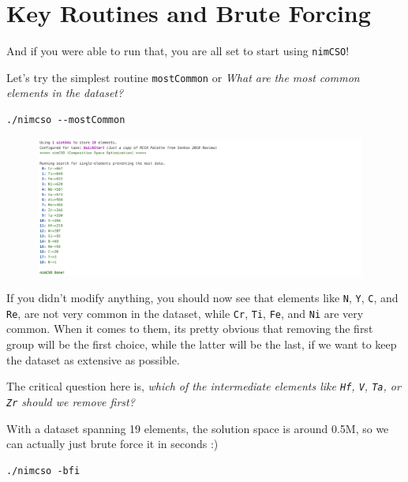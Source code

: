 \hypertarget{key-routines-and-brute-forcing}{
\section{Key Routines and Brute Forcing}\label{nimcsotutorial:key-routines-and-brute-forcing}}

And if you were able to run that, you are all set to start using
\texttt{nimCSO}!

Let's try the simplest routine \texttt{mostCommon} or
\emph{What are the most common elements in the dataset?}

\begin{verbatim}
./nimcso --mostCommon
\end{verbatim}

\begin{figure}[H]
  \centering
  \includegraphics[width=0.97\textwidth]{nimcsotutorial/3.png}
\end{figure}

If you didn't modify anything, you should now see that elements like
\texttt{N}, \texttt{Y},
\texttt{C}, and \texttt{Re}, are not
very common in the dataset, while \texttt{Cr},
\texttt{Ti}, \texttt{Fe}, and
\texttt{Ni} are very common. When it comes to them, its
pretty obvious that removing the first group will be the first choice,
while the latter will be the last, if we want to keep the dataset as
extensive as possible.

The critical question here is, \emph{which of the intermediate elements
like \texttt{Hf}, \texttt{V},
\texttt{Ta}, or \texttt{Zr} should we
remove first?}

With a dataset spanning 19 elements, the solution space is around 0.5M,
so we can actually just brute force it in seconds :)

\begin{verbatim}
./nimcso -bfi
\end{verbatim}


